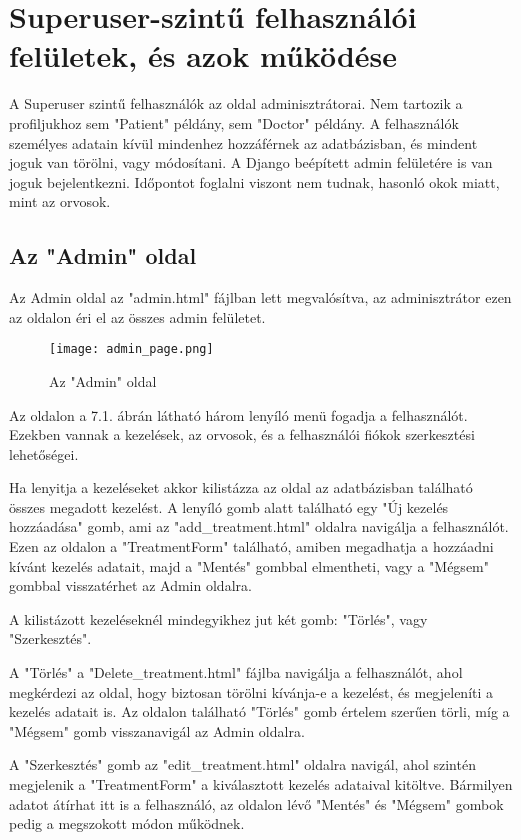 \chapter{Superuser-szintű felhasználói felületek, és azok működése}
\label{chap:fejezet7}

A Superuser szintű felhasználók az oldal adminisztrátorai. Nem tartozik a profiljukhoz sem "Patient" példány, sem "Doctor" példány. A felhasználók személyes adatain kívül mindenhez hozzáférnek az adatbázisban, és mindent joguk van törölni, vagy módosítani. A Django beépített admin felületére is van joguk bejelentkezni. Időpontot foglalni viszont nem tudnak, hasonló okok miatt, mint az orvosok.

\section{Az "Admin" oldal}

Az Admin oldal az "admin.html" fájlban lett megvalósítva, az adminisztrátor ezen az oldalon éri el az összes admin felületet.

\begin{figure}[H]
	\caption{Az "Admin" oldal}
	\label{fig:adminpage}
	\centering
	\texttt{[image: admin\_page.png]}
\end{figure}

Az oldalon a 7.1. ábrán látható három lenyíló menü fogadja a felhasználót. Ezekben vannak a kezelések, az orvosok, és a felhasználói fiókok szerkesztési lehetőségei.

Ha lenyitja a kezeléseket akkor kilistázza az oldal az adatbázisban található összes megadott kezelést. A lenyíló gomb alatt található egy "Új kezelés hozzáadása" gomb, ami az "add\_treatment.html" oldalra navigálja a felhasználót. Ezen az oldalon a "TreatmentForm" található, amiben megadhatja a hozzáadni kívánt kezelés adatait, majd a "Mentés" gombbal elmentheti, vagy a "Mégsem" gombbal visszatérhet az Admin oldalra.

A kilistázott kezeléseknél mindegyikhez jut két gomb: "Törlés", vagy "Szerkesztés".

A "Törlés" a "Delete\_treatment.html" fájlba navigálja a felhasználót, ahol megkérdezi az oldal, hogy biztosan törölni kívánja-e a kezelést, és megjeleníti a kezelés adatait is. Az oldalon található "Törlés" gomb értelem szerűen törli, míg a "Mégsem" gomb visszanavigál az Admin oldalra.

A "Szerkesztés" gomb az "edit\_treatment.html" oldalra navigál, ahol szintén megjelenik a "TreatmentForm" a kiválasztott kezelés adataival kitöltve. Bármilyen adatot átírhat itt is a felhasználó, az oldalon lévő "Mentés" és "Mégsem" gombok pedig a megszokott módon működnek.

